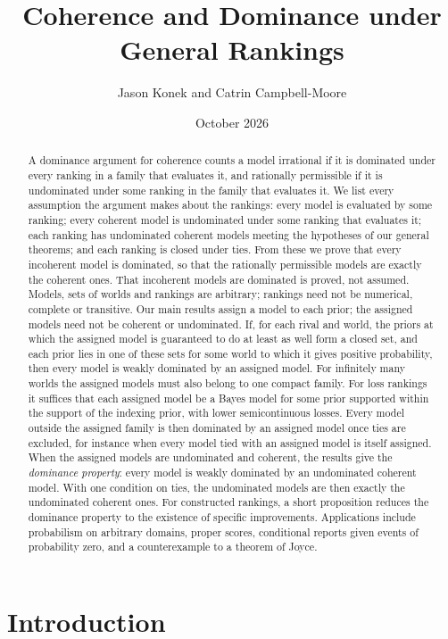 \documentclass[11pt]{article}
\title{Coherence and Dominance under General Rankings}
\author{Jason Konek and Catrin Campbell-Moore}
\date{October 2026}
\theoremstyle{definition}
\theoremstyle{remark}
\begin{document}
\maketitle

\begin{abstract}
A dominance argument for coherence counts a model irrational if it is dominated under every ranking in a family that evaluates it, and rationally permissible if it is undominated under some ranking in the family that evaluates it. We list every assumption the argument makes about the rankings: every model is evaluated by some ranking; every coherent model is undominated under some ranking that evaluates it; each ranking has undominated coherent models meeting the hypotheses of our general theorems; and each ranking is closed under ties. From these we prove that every incoherent model is dominated, so that the rationally permissible models are exactly the coherent ones. That incoherent models are dominated is proved, not assumed. Models, sets of worlds and rankings are arbitrary; rankings need not be numerical, complete or transitive. Our main results assign a model to each prior; the assigned models need not be coherent or undominated. If, for each rival and world, the priors at which the assigned model is guaranteed to do at least as well form a closed set, and each prior lies in one of these sets for some world to which it gives positive probability, then every model is weakly dominated by an assigned model. For infinitely many worlds the assigned models must also belong to one compact family. For loss rankings it suffices that each assigned model be a Bayes model for some prior supported within the support of the indexing prior, with lower semicontinuous losses. Every model outside the assigned family is then dominated by an assigned model once ties are excluded, for instance when every model tied with an assigned model is itself assigned. When the assigned models are undominated and coherent, the results give the \emph{dominance property}: every model is weakly dominated by an undominated coherent model. With one condition on ties, the undominated models are then exactly the undominated coherent ones. For constructed rankings, a short proposition reduces the dominance property to the existence of specific improvements. Applications include probabilism on arbitrary domains, proper scores, conditional reports given events of probability zero, and a counterexample to a theorem of Joyce.
\end{abstract}

\section{Introduction}\label{sec:intro}
\end{document}
